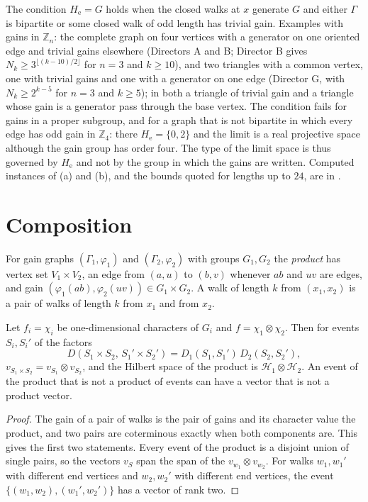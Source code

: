 The condition $H_{\mathrm e}=G$ holds when the closed walks at $x$ generate $G$ and either $\Gamma$ is bipartite or some closed walk of odd length has trivial gain. Examples with gains in $\mathbb{Z}_n$: the complete graph on four vertices with a generator on one oriented edge and trivial gains elsewhere (Directors A and B; Director B gives $N_k\ge3^{\lfloor(k-10)/2\rfloor}$ for $n=3$ and $k\ge10$), and two triangles with a common vertex, one with trivial gains and one with a generator on one edge (Director G, with $N_k\ge2^{k-5}$ for $n=3$ and $k\ge5$); in both a triangle of trivial gain and a triangle whose gain is a generator pass through the base vertex. The condition fails for gains in a proper subgroup, and for a graph that is not bipartite in which every edge has odd gain in $\mathbb{Z}_4$: there $H_{\mathrm e}=\{0,2\}$ and the limit is a real projective space although the gain group has order four. The type of the limit space is thus governed by $H_{\mathrm e}$ and not by the group in which the gains are written. Computed instances of (a) and (b), and the bounds quoted for lengths up to $24$, are in \cite{comp4}.

\section{Composition}\label{sec:compo}

For gain graphs $(\Gamma_1,\varphi_1)$ and $(\Gamma_2,\varphi_2)$ with groups $G_1,G_2$ the \emph{product} has vertex set $V_1\times V_2$, an edge from $(a,u)$ to $(b,v)$ whenever $ab$ and $uv$ are edges, and gain $(\varphi_1(ab),\varphi_2(uv))\in G_1\times G_2$. A walk of length $k$ from $(x_1,x_2)$ is a pair of walks of length $k$ from $x_1$ and from $x_2$.

\begin{proposition}\label{prop:tensor}
Let $f_i=\chi_i$ be one-dimensional characters of $G_i$ and $f=\chi_1\otimes\chi_2$. Then for events $S_i,S_i'$ of the factors
\[
D(S_1\times S_2,\,S_1'\times S_2')=D_1(S_1,S_1')\,D_2(S_2,S_2'),
\]
$v_{S_1\times S_2}=v_{S_1}\otimes v_{S_2}$, and the Hilbert space of the product is $\mathcal{H}_1\otimes\mathcal{H}_2$. An event of the product that is not a product of events can have a vector that is not a product vector.
\end{proposition}
\begin{proof}
The gain of a pair of walks is the pair of gains and its character value the product, and two pairs are coterminous exactly when both components are. This gives the first two statements. Every event of the product is a disjoint union of single pairs, so the vectors $v_S$ span the span of the $v_{w_1}\otimes v_{w_2}$. For walks $w_1,w_1'$ with different end vertices and $w_2,w_2'$ with different end vertices, the event $\{(w_1,w_2),(w_1',w_2')\}$ has a vector of rank two.
\end{proof}

